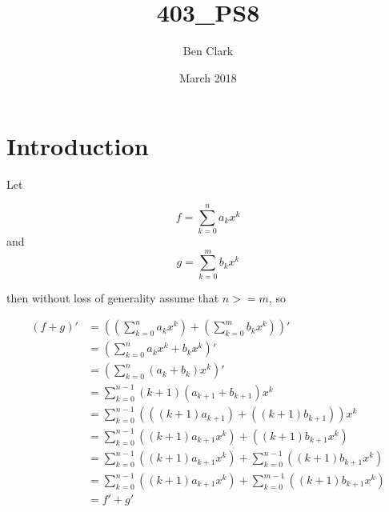 \documentclass[a4paper,10pt]{extarticle}
\title{403_PS8}
\author{Ben Clark}
\date{March 2018}
\begin{document}
\section{Introduction}

Let 

\[ f = \sum_{k=0}^{n} a_k x^k\] and 
\[ g = \sum_{k=0}^{m} b_k x^k\]

then without loss of generality assume that $n >= m$, so

\begin{align*}
    (f + g)' &= ((\sum_{k=0}^{n} a_k x^k) + (\sum_{k=0}^{m} b_k x^k))' \\
    &= (\sum_{k=0}^{n} a_k x^k + b_k x^k)' \\
    &= (\sum_{k=0}^{n} (a_k + b_k) x^k)' \\
    &= \sum_{k=0}^{n - 1} (k+1)(a_{k+1} + b_{k+1}) x^k \\
    &= \sum_{k=0}^{n - 1} (((k+1) a_{k+1}) + ((k+1) b_{k+1})) x^k \\
    &= \sum_{k=0}^{n - 1} ((k+1) a_{k+1} x^k) + ((k+1) b_{k+1} x^k ) \\
    &= \sum_{k=0}^{n - 1} ((k+1) a_{k+1} x^k) + \sum_{k=0}^{n - 1} ((k+1) b_{k+1} x^k ) \\
    &= \sum_{k=0}^{n - 1} ((k+1) a_{k+1} x^k) + \sum_{k=0}^{m - 1} ((k+1) b_{k+1} x^k ) \\
    &= f' + g'
\end{align*}
\end{document}
